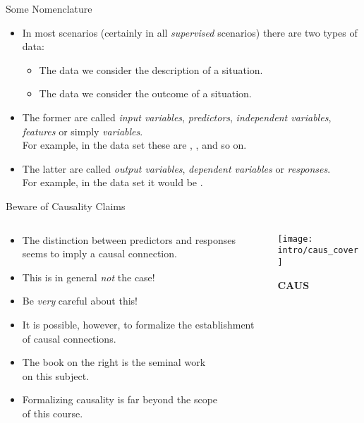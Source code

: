 \documentclass[mathserif, aspectratio=169]{beamer}
\begin{document}
\begin{frame}{Some Nomenclature}
	\begin{itemize}
		\item In most scenarios (certainly in all \emph{supervised} scenarios) there are two types of data:
			\begin{itemize}
				\item The data we consider the description of a situation.
				\item The data we consider the outcome of a situation.
			\end{itemize}
		\item The former are called \emph{input variables}, \emph{predictors}, \emph{independent variables}, \\
			\emph{features} or simply \emph{variables}.\\
			For example, in the  data set these are , ,  and so on.
		\item The latter are called \emph{output variables}, \emph{dependent variables} or \emph{responses}.\\
			For example, in the  data set it would be .
	\end{itemize}
\end{frame}

\begin{frame}{Beware of Causality Claims}
	\begin{columns}
		\begin{column}{0.6\textwidth}
			\begin{itemize}
				\item The distinction between predictors and responses seems to imply a causal connection.  
				\item This is in general \emph{not} the case!
				\item Be \emph{very} careful about this!
				\item It is possible, however, to formalize the establishment of causal connections.
				\item The book on the right is the seminal work\\ on this subject.
				\item Formalizing causality is far beyond the scope\\ of this course.
			\end{itemize}
		\end{column}
		\begin{column}{0.4\textwidth}
			\begin{center}
				\texttt{[image: intro/caus\_cover]}
			\end{center}
			\begin{center}
				{\bfseries\blue CAUS}
			\end{center}
		\end{column}
	\end{columns}
\end{frame}
\end{document}
